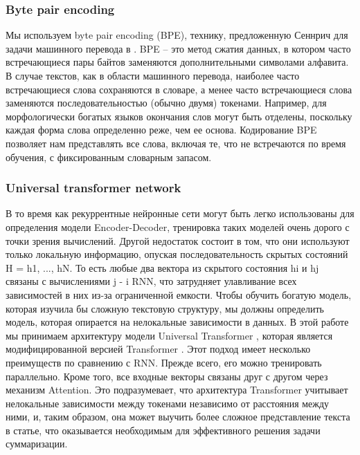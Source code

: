 \documentclass[aps,%
12pt,%
final,%
oneside,
onecolumn,%
musixtex, %
superscriptaddress,%
centertags]{article} %
\begin{document}
\subsubsection{Byte pair encoding}

Мы используем byte pair encoding (BPE), технику, предложенную Сеннрич для задачи машинного перевода в \cite{DBLP:journals/corr/SennrichHB15}. BPE -- это метод сжатия данных, в котором часто встречающиеся пары байтов заменяются дополнительными символами алфавита. В случае текстов, как в области машинного перевода, наиболее часто встречающиеся слова сохраняются в словаре, а менее часто встречающиеся слова заменяются последовательностью (обычно двумя) токенами. Например, для морфологически богатых языков окончания слов могут быть отделены, поскольку каждая форма слова определенно реже, чем ее основа. Кодирование BPE позволяет нам представлять все слова, включая те, что не встречаются по время обучения, с фиксированным словарным запасом.



\subsubsection{Universal transformer network}
В то время как рекуррентные нейронные сети могут быть легко использованы для определения модели Encoder-Decoder, тренировка таких моделей очень дорого с точки зрения вычислений. Другой недостаток состоит в том, что они используют только локальную информацию, опуская последовательность скрытых состояний H = {h1, ..., hN}. То есть любые два вектора из скрытого состояния hi и hj связаны с вычислениями j - i RNN, что затрудняет улавливание всех зависимостей в них из-за ограниченной емкости. Чтобы обучить богатую модель, которая изучила бы сложную текстовую структуру, мы должны определить модель, которая опирается на нелокальные зависимости в данных.
В этой работе мы принимаем архитектуру модели Universal Transformer \cite{}, которая является модифицированной версией Transformer \cite{}. Этот подход имеет несколько преимуществ по сравнению с RNN. Прежде всего, его можно тренировать параллельно. Кроме того, все входные векторы связаны друг с другом через механизм Attention. Это подразумевает, что архитектура Transformer учитывает нелокальные зависимости между токенами независимо от расстояния между ними, и, таким образом, она может выучить более сложное представление текста в статье, что оказывается необходимым для эффективного решения задачи суммаризации.
\end{document}
